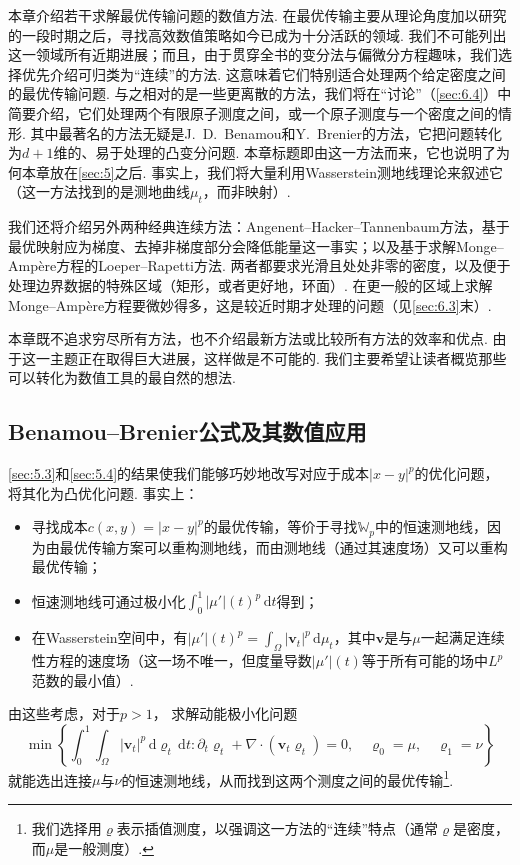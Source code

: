 本章介绍若干求解最优传输问题的数值方法. 在最优传输主要从理论角度加以研究的一段时期之后，寻找高效数值策略如今已成为十分活跃的领域. 我们不可能列出这一领域所有近期进展；而且，由于贯穿全书的变分法与偏微分方程趣味，我们选择优先介绍可归类为“连续”的方法. 这意味着它们特别适合处理两个给定密度之间的最优传输问题. 与之相对的是一些更离散的方法，我们将在“讨论”（\autoref{sec:6.4}）中简要介绍，它们处理两个有限原子测度之间，或一个原子测度与一个密度之间的情形. 其中最著名的方法无疑是J.~D.~Benamou和Y.~Brenier的方法，它把问题转化为$d+1$维的、易于处理的凸变分问题. 本章标题即由这一方法而来，它也说明了为何本章放在\autoref{sec:5}之后. 事实上，我们将大量利用Wasserstein测地线理论来叙述它（这一方法找到的是测地曲线$\mu_t$，而非映射）.

我们还将介绍另外两种经典连续方法：Angenent--Hacker--Tannenbaum方法，基于最优映射应为梯度、去掉非梯度部分会降低能量这一事实；以及基于求解Monge--Ampère方程的Loeper--Rapetti方法. 两者都要求光滑且处处非零的密度，以及便于处理边界数据的特殊区域（矩形，或者更好地，环面）. 在更一般的区域上求解Monge--Ampère方程要微妙得多，这是较近时期才处理的问题（见\autoref{sec:6.3}末）.

本章既不追求穷尽所有方法，也不介绍最新方法或比较所有方法的效率和优点. 由于这一主题正在取得巨大进展，这样做是不可能的. 我们主要希望让读者概览那些可以转化为数值工具的最自然的想法.

\subsection{Benamou--Brenier公式及其数值应用}\label{sec:6.1}
\autoref{sec:5.3}和\autoref{sec:5.4}的结果使我们能够巧妙地改写对应于成本$|x-y|^p$的优化问题，将其化为凸优化问题. 事实上：
\begin{itemize}
\item {}\label{idx:i43-p220}
\label{idx:i66-p220}
寻找成本$c(x,y)=|x-y|^p$的最优传输，等价于寻找$\mathbb W_p$中的恒速测地线，因为由最优传输方案可以重构测地线，而由测地线（通过其速度场）又可以重构最优传输；
\item 恒速测地线可通过极小化$\int_0^1|\mu'|(t)^p\,\mathrm dt$得到；
\item 在Wasserstein空间中，有$|\mu'|(t)^p=\int_\Omega|\mathbf v_t|^p\,\mathrm d\mu_t$，其中$\mathbf v$是与$\mu$一起满足连续性方程的速度场（这一场不唯一，但度量导数$|\mu'|(t)$等于所有可能的场中$L^p$范数的最小值）.
\end{itemize}
由这些考虑，对于$p>1$，\label{idx:i85-p220}
求解动能极小化问题
\[
\min\left\{\int_0^1\int_\Omega|\mathbf v_t|^p\,\mathrm d\varrho_t\,\mathrm dt:
 \partial_t\varrho_t+\nabla\cdot(\mathbf v_t\varrho_t)=0,\quad
 \varrho_0=\mu,\quad\varrho_1=\nu\right\}
\]
就能选出连接$\mu$与$\nu$的恒速测地线，从而找到这两个测度之间的最优传输\footnote{我们选择用$\varrho$表示插值测度，以强调这一方法的“连续”特点（通常$\varrho$是密度，而$\mu$是一般测度）.}.

